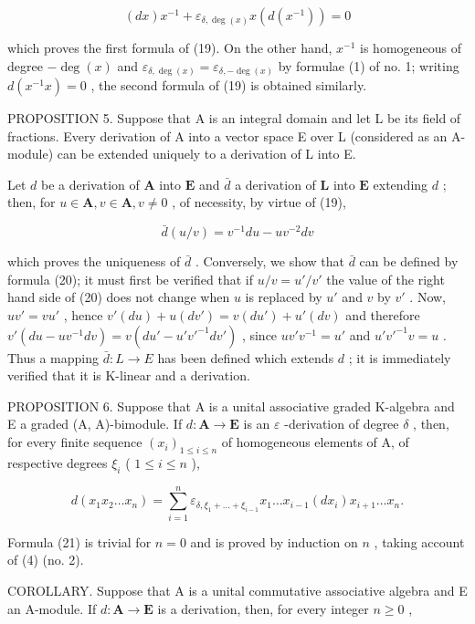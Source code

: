 \[
(d x) x ^ {- 1} + \varepsilon_ {\delta , \deg (x)} x (d (x ^ {- 1})) = 0
\]

which proves the first formula of (19). On the other hand, \(x^{-1}\) is homogeneous of degree \(-\deg(x)\) and \(\varepsilon_{\delta,\deg(x)} = \varepsilon_{\delta,-\deg(x)}\) by formulae (1) of no. 1; writing \(d(x^{-1}x) = 0\) , the second formula of (19) is obtained similarly.

PROPOSITION 5. Suppose that A is an integral domain and let L be its field of fractions. Every derivation of A into a vector space E over L (considered as an A-module) can be extended uniquely to a derivation of L into E.

Let \(d\) be a derivation of \(\mathbf{A}\) into \(\mathbf{E}\) and \(\bar{d}\) a derivation of \(\mathbf{L}\) into \(\mathbf{E}\) extending \(d\) ; then, for \(u \in \mathbf{A}, v \in \mathbf{A}, v \neq 0\) , of necessity, by virtue of (19),

\[
\bar {d} (u / v) = v ^ {- 1} d u - u v ^ {- 2} d v\tag{20}
\]

which proves the uniqueness of \(\bar{d}\) . Conversely, we show that \(\bar{d}\) can be defined by formula (20); it must first be verified that if \(u / v = u' / v'\) the value of the right hand side of (20) does not change when \(u\) is replaced by \(u'\) and \(v\) by \(v'\) . Now, \(uv' = vu'\) , hence \(v'(du) + u(dv') = v(du') + u'(dv)\) and therefore \(v'(du - uv^{-1}dv) = v(du' - u'v'^{-1}dv')\) , since \(uv'v^{-1} = u'\) and \(u'v'^{-1}v = u\) . Thus a mapping \(\bar{d}: L \to E\) has been defined which extends \(d\) ; it is immediately verified that it is K-linear and a derivation.

PROPOSITION 6. Suppose that A is a unital associative graded K-algebra and E a graded (A, A)-bimodule. If \(d: \mathbf{A} \to \mathbf{E}\) is an \(\varepsilon\) -derivation of degree \(\delta\) , then, for every finite sequence \((x_i)_{1 \leqslant i \leqslant n}\) of homogeneous elements of A, of respective degrees \(\xi_i\) ( \(1 \leqslant i \leqslant n\) ),

\[
d \left(x _ {1} x _ {2} \dots x _ {n}\right) = \sum_ {i = 1} ^ {n} \varepsilon_ {\delta, \xi_ {1} + \dots + \xi_ {i - 1}} x _ {1} \dots x _ {i - 1} \left(d x _ {i}\right) x _ {i + 1} \dots x _ {n}.\tag{21}
\]

Formula (21) is trivial for \(n = 0\) and is proved by induction on \(n\) , taking account of (4) (no. 2).

COROLLARY. Suppose that A is a unital commutative associative algebra and E an A-module. If \(d: \mathbf{A} \to \mathbf{E}\) is a derivation, then, for every integer \(n \geqslant 0\) ,

